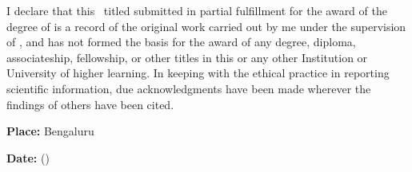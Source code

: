 I declare that this \Doctype \ titled \textbf{\textit{\Title}} submitted in
partial fulfillment for the award of the degree of
{\bf\Degreetext} is a record of the original work carried out by me
under the supervision of {\bf\Advisor}, and has not formed the basis for the
award of any degree, diploma, associateship, fellowship, or other titles in
this or any other Institution or University of higher learning. In keeping
with the ethical practice in reporting scientific information, due
acknowledgments have been made wherever the findings of others have been
cited.

\vspace{15mm}

\noindent\textbf{Place: }Bengaluru\hfill \Author \hspace{5mm}

\vspace{4mm}

\noindent\textbf{Date: }\Date \hfill (\Studentid)\hspace{3mm}

